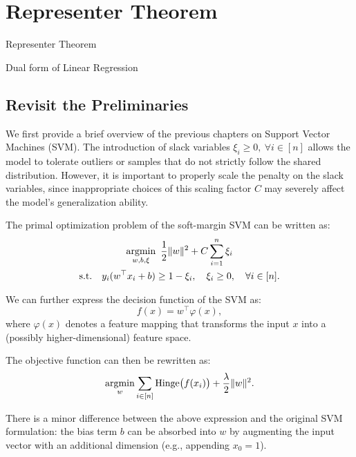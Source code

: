 \documentclass[../main]{subfiles}
\begin{document}
\chapter{Representer Theorem}
\begin{introduction}
    \item Representer Theorem
    \item Dual form of Linear Regression
\end{introduction}
\section{Revisit the Preliminaries}
We first provide a brief overview of the previous chapters on Support Vector Machines (SVM).  
The introduction of slack variables $\xi_i \ge 0,\ \forall i \in [n]$ allows the model to tolerate outliers or samples that do not strictly follow the shared distribution.  
However, it is important to properly scale the penalty on the slack variables, since inappropriate choices of this scaling factor $C$ may severely affect the model’s generalization ability.

The primal optimization problem of the soft-margin SVM can be written as:
\begin{gather*}
    \mathop{\mathrm{argmin}}_{w,b,\xi}\ \frac{1}{2}\|w\|^2 + C\sum_{i=1}^{n}\xi_i \\
    \text{s.t.}\quad y_i(w^\top x_i + b) \ge 1 - \xi_i,\quad \xi_i \ge 0,\quad \forall i \in [n].
\end{gather*}

We can further express the decision function of the SVM as:
\begin{equation}
    f(x) = w^\top \varphi(x),
\end{equation}
where $\varphi(x)$ denotes a feature mapping that transforms the input $x$ into a (possibly higher-dimensional) feature space.  

The objective function can then be rewritten as:
\begin{equation}
    \mathop{\mathrm{argmin}}_w \sum_{i \in [n]} \mathrm{Hinge}\bigl(f(x_i)\bigr) + \frac{\lambda}{2}\|w\|^2.
\end{equation}

\begin{remark}
    There is a minor difference between the above expression and the original SVM formulation:  
    the bias term $b$ can be absorbed into $w$ by augmenting the input vector with an additional dimension (e.g., appending $x_0 = 1$).  
\end{remark}
\end{document}

